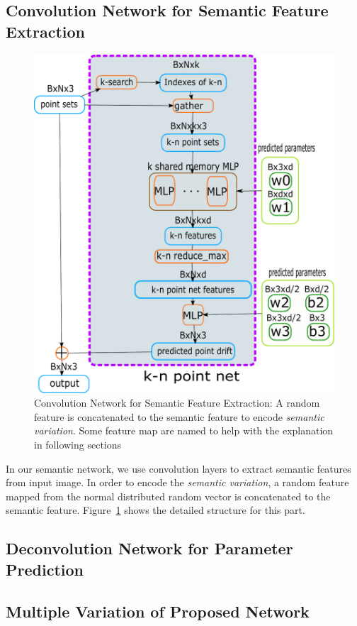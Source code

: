 \subsection{Convolution Network for Semantic Feature Extraction}
\label{subsec:conv}
\begin{figure}[htbp]
	\centering
	\includegraphics[width=\linewidth]{img/net/k-n_pointnet}
	\caption{Convolution Network for Semantic Feature Extraction: A random feature is concatenated to the semantic feature to encode \textit{semantic variation}. Some feature map are named to help with the explanation in following sections}
	\label{fig:conv}
\end{figure}
In our semantic network, we use convolution layers to extract semantic features from input image. In order to encode the \textit{semantic variation}, a random feature mapped from the normal distributed random vector is concatenated to the semantic feature.  Figure~\ref{fig:conv} shows the detailed structure for this part. 

\subsection{Deconvolution Network for Parameter Prediction}
\label{subsec:deconv}

\subsection{Multiple Variation of Proposed Network}
\label{subsec:variation}

